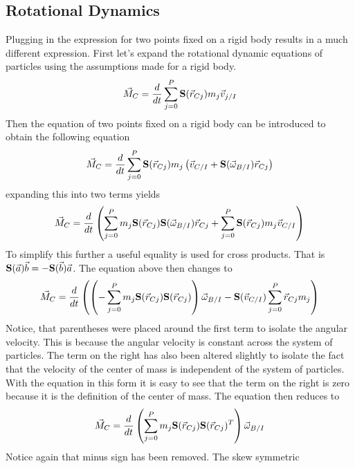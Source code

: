 \documentclass{article}
\begin{document}
\subsection{Rotational Dynamics}

Plugging in the expression for two points fixed on a rigid body
results in a much different expression. First let's expand the
rotational dynamic equations of particles using the assumptions made
for a rigid body.
\begin{equation}
\vec{M}_C = \frac{d}{dt}\sum\limits_{j=0}^P {\bf S}(\vec{r}_{Cj}) m_j\vec{v}_{j/I}
\end{equation}
Then the equation of two points fixed on a rigid body can be
introduced to obtain the following equation
\begin{equation}
\vec{M}_C = \frac{d}{dt}\sum\limits_{j=0}^P {\bf S}(\vec{r}_{Cj}) m_j\left(\vec{v}_{C/I} + {\bf S}(\vec{\omega}_{B/I}) \vec{r}_{Cj}\right)
\end{equation}
expanding this into two terms yields
\begin{equation}
\vec{M}_C =  \frac{d}{dt}\left(\sum\limits_{j=0}^P m_j{\bf S}(\vec{r}_{Cj}) {\bf S}(\vec{\omega}_{B/I}) \vec{r}_{Cj} + \sum\limits_{j=0}^P {\bf S}(\vec{r}_{Cj})m_j\vec{v}_{C/I}\right)
\end{equation}
To simplify this further a useful equality is used for cross
products. That is ${\bf S}(\vec{a})\vec{b}=-{\bf
  S}(\vec{b})\vec{a}$. The equation above then changes to
\begin{equation}
\vec{M}_C =  \frac{d}{dt}\left(\left(-\sum\limits_{j=0}^P m_j{\bf S}(\vec{r}_{Cj}){\bf
  S}(\vec{r}_{Cj})\right)\vec{\omega}_{B/I} - {\bf S}(\vec{v}_{C/I})
\sum\limits_{j=0}^P \vec{r}_{Cj}m_j\right)
\end{equation}
Notice, that parentheses were placed around the first term to isolate
the angular velocity. This is because the angular velocity is constant
across the system of particles. The term on the right has also been
altered slightly to isolate the fact that the velocity of the center
of mass is independent of the system of particles. With the equation
in this form it is easy to see that the term on the right is zero
because it is the definition of the center of mass. The equation then
reduces to 
\begin{equation}
\vec{M}_C =  \frac{d}{dt}\left(\sum\limits_{j=0}^P m_j{\bf S}(\vec{r}_{Cj}){\bf
  S}(\vec{r}_{Cj})^T\right)\vec{\omega}_{B/I} 
\end{equation}
Notice again that minus sign has been removed. The skew symmetric
\end{document}
